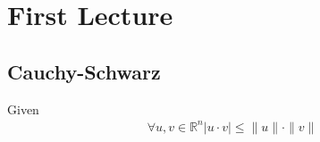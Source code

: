 \chapter{First Lecture}

\section{Cauchy-Schwarz}

  Given
  \begin{align}
    \forall u, v \in \mathbb{R}^n |u \cdot v| \leq \|u\| \cdot \|v\|
  \end{align}